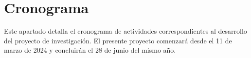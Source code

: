 \section{Cronograma}
Este apartado detalla el cronograma de actividades correspondientes al desarrollo del proyecto de investigación. El presente proyecto comenzará desde el 11 de marzo de 2024 y concluirán el 28 de junio del mismo año.